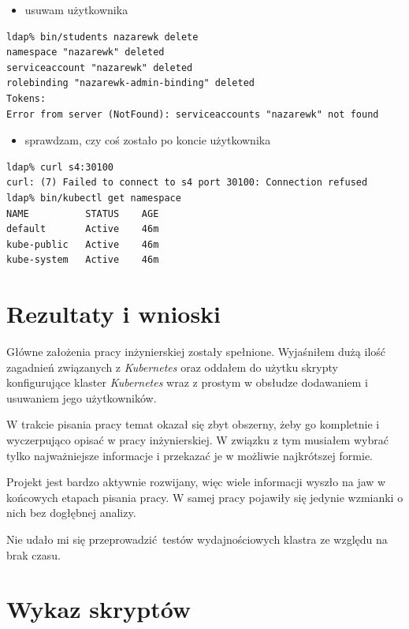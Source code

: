 \documentclass[a4paper,12pt,twoside,openany]{report}
\providecommand{\tightlist}{%
  \setlength{\itemsep}{0pt}\setlength{\parskip}{0pt}}
\begin{document}
\begin{itemize}
\tightlist
\item
  usuwam użytkownika
\end{itemize}

\begin{lstlisting}
ldap% bin/students nazarewk delete
namespace "nazarewk" deleted
serviceaccount "nazarewk" deleted
rolebinding "nazarewk-admin-binding" deleted
Tokens:
Error from server (NotFound): serviceaccounts "nazarewk" not found
\end{lstlisting}

\begin{itemize}
\tightlist
\item
  sprawdzam, czy coś zostało po koncie użytkownika
\end{itemize}

\begin{lstlisting}
ldap% curl s4:30100
curl: (7) Failed to connect to s4 port 30100: Connection refused
ldap% bin/kubectl get namespace 
NAME          STATUS    AGE
default       Active    46m
kube-public   Active    46m
kube-system   Active    46m
\end{lstlisting}

\hypertarget{rezultaty-i-wnioski}{%
\chapter{Rezultaty i wnioski}\label{rezultaty-i-wnioski}}

Główne założenia pracy inżynierskiej zostały spełnione. Wyjaśniłem dużą
ilość zagadnień związanych z \emph{Kubernetes} oraz oddałem do użytku
skrypty konfigurujące klaster \emph{Kubernetes} wraz z prostym w
obsłudze dodawaniem i usuwaniem jego użytkowników.

W trakcie pisania pracy temat okazał się zbyt obszerny, żeby go
kompletnie i wyczerpująco opisać w pracy inżynierskiej. W związku z tym
musiałem wybrać tylko najważniejsze informacje i przekazać je w możliwie
najkrótszej formie.

Projekt jest bardzo aktywnie rozwijany, więc wiele informacji wyszło na
jaw w końcowych etapach pisania pracy. W samej pracy pojawiły się
jedynie wzmianki o nich bez dogłębnej analizy.

Nie udało mi się przeprowadzić~testów wydajnościowych klastra ze względu
na brak czasu.

\appendix

\hypertarget{wykaz-skryptuxf3w}{%
\chapter{Wykaz skryptów}\label{wykaz-skryptuxf3w}}
\end{document}
